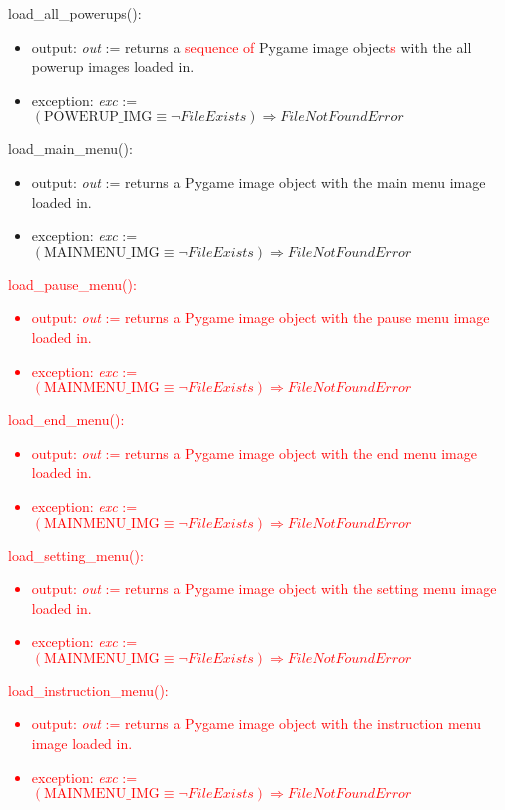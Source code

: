 \documentclass[12pt]{article}
\begin{document}
\noindent load\_all\_powerups():
\begin{itemize}
    \item output: \textit{out} := returns a \textcolor{red}{sequence of }Pygame image object\textcolor{red}{s} with the all powerup images loaded in.
    \item exception: \textit{exc} := $(\text{POWERUP\_IMG} \equiv \neg FileExists) \Rightarrow FileNotFoundError$
\end{itemize}

\noindent load\_main\_menu():
\begin{itemize}
    \item output: \textit{out} := returns a Pygame image object with the main menu image loaded in.
    \item exception: \textit{exc} := $(\text{MAINMENU\_IMG} \equiv \neg FileExists) \Rightarrow FileNotFoundError$
\end{itemize}

\noindent \textcolor{red}{load\_pause\_menu():
\begin{itemize}
    \item output: \textit{out} := returns a Pygame image object with the pause menu image loaded in.
    \item exception: \textit{exc} := $(\text{MAINMENU\_IMG} \equiv \neg FileExists) \Rightarrow FileNotFoundError$
\end{itemize}
}

\noindent \textcolor{red}{load\_end\_menu():
\begin{itemize}
    \item output: \textit{out} := returns a Pygame image object with the end menu image loaded in.
    \item exception: \textit{exc} := $(\text{MAINMENU\_IMG} \equiv \neg FileExists) \Rightarrow FileNotFoundError$
\end{itemize}
}

\noindent \textcolor{red}{load\_setting\_menu():
\begin{itemize}
    \item output: \textit{out} := returns a Pygame image object with the setting menu image loaded in.
    \item exception: \textit{exc} := $(\text{MAINMENU\_IMG} \equiv \neg FileExists) \Rightarrow FileNotFoundError$
\end{itemize}
}

\noindent \textcolor{red}{load\_instruction\_menu():
\begin{itemize}
    \item output: \textit{out} := returns a Pygame image object with the instruction menu image loaded in.
    \item exception: \textit{exc} := $(\text{MAINMENU\_IMG} \equiv \neg FileExists) \Rightarrow FileNotFoundError$
\end{itemize}
}
\end{document}
